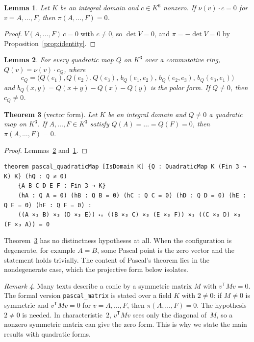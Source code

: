 \documentclass[11pt]{article}
\newtheorem{theorem}{Theorem}
\newtheorem{lemma}[theorem]{Lemma}
\theoremstyle{remark}
\newtheorem{remark}[theorem]{Remark}
\newcommand{\lean}[1]{\texttt{#1}}
\begin{document}
\begin{lemma}\label{lem:poly}
Let $K$ be an integral domain and $c\in K^6$ nonzero. If $\nu(v)\cdot c=0$ for $v=A,\dots,F$, then
$\pi(A,\dots,F)=0$.
\end{lemma}
\begin{proof}
$V(A,\dots,F)\,c=0$ with $c\ne0$, so $\det V=0$, and $\pi=-\det V=0$ by
Proposition~\ref{prop:identity}.
\end{proof}

\begin{lemma}\label{lem:coeffs}
For every quadratic map $Q$ on $K^3$ over a commutative ring, $Q(v)=\nu(v)\cdot c_Q$, where
\[
c_Q=\bigl(Q(e_1),Q(e_2),Q(e_3),\,b_Q(e_1,e_2),\,b_Q(e_2,e_3),\,b_Q(e_3,e_1)\bigr)
\]
and $b_Q(x,y)=Q(x+y)-Q(x)-Q(y)$ is the polar form. If $Q\ne0$, then $c_Q\ne0$.
\end{lemma}

\begin{theorem}[vector form]\label{thm:vector}
Let $K$ be an integral domain and $Q\ne0$ a quadratic map on $K^3$. If $A,\dots,F\in K^3$ satisfy
$Q(A)=\dots=Q(F)=0$, then $\pi(A,\dots,F)=0$.
\end{theorem}

\begin{proof}
Lemmas~\ref{lem:coeffs} and~\ref{lem:poly}.
\end{proof}

\begin{lstlisting}
theorem pascal_quadraticMap [IsDomain K] {Q : QuadraticMap K (Fin 3 → K) K} (hQ : Q ≠ 0)
    {A B C D E F : Fin 3 → K}
    (hA : Q A = 0) (hB : Q B = 0) (hC : Q C = 0) (hD : Q D = 0) (hE : Q E = 0) (hF : Q F = 0) :
    ((A ⨯₃ B) ⨯₃ (D ⨯₃ E)) ⬝ᵥ ((B ⨯₃ C) ⨯₃ (E ⨯₃ F)) ⨯₃ ((C ⨯₃ D) ⨯₃ (F ⨯₃ A)) = 0
\end{lstlisting}

Theorem~\ref{thm:vector} has no distinctness hypotheses at all. When the configuration is
degenerate, for example $A=B$, some Pascal point is the zero vector and the statement holds
trivially. The content of Pascal's theorem lies in the nondegenerate case, which the projective
form below isolates.

\begin{remark}\label{rem:matrix}
Many texts describe a conic by a symmetric matrix $M$ with $v^{\mathsf T}Mv=0$. The formal version
\lean{pascal\_matrix} is stated over a field $K$ with $2\ne0$: if $M\ne0$ is symmetric and
$v^{\mathsf T}Mv=0$ for $v=A,\dots,F$, then $\pi(A,\dots,F)=0$. The hypothesis $2\ne0$ is needed. In characteristic~$2$, $v^{\mathsf T}Mv$
sees only the diagonal of~$M$, so a nonzero symmetric matrix can give the zero form. This is why
we state the main results with quadratic forms.
\end{remark}
\end{document}
